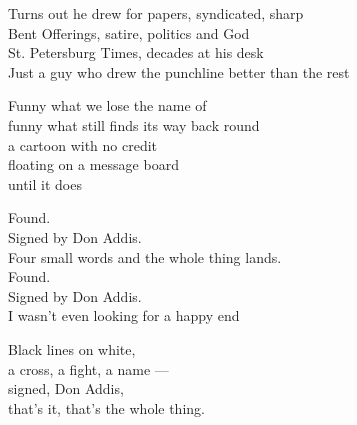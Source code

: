 \begin{lyrics}
Turns out he drew for papers, syndicated, sharp\\
Bent Offerings, satire, politics and God\\
St. Petersburg Times, decades at his desk\\
Just a guy who drew the punchline better than the rest

Funny what we lose the name of\\
funny what still finds its way back round\\
a cartoon with no credit\\
floating on a message board\\
until it does

Found.\\
Signed by Don Addis.\\
Four small words and the whole thing lands.\\
Found.\\
Signed by Don Addis.\\
I wasn't even looking for a happy end

Black lines on white,\\
a cross, a fight, a name —\\
signed, Don Addis,\\
that's it, that's the whole thing.
\end{lyrics}


